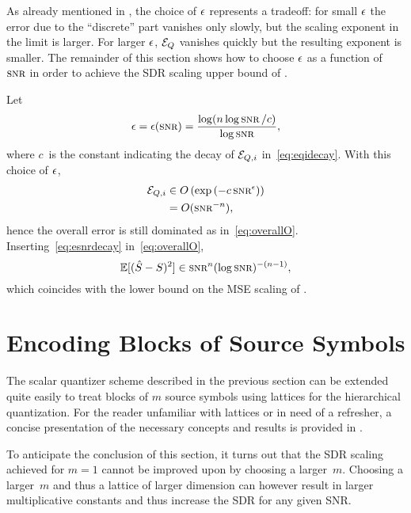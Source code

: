 As already mentioned in , the choice of $\epsilon$ represents a
tradeoff: for small $\epsilon$ the error due to the ``discrete'' part vanishes only
slowly, but the scaling exponent in the limit is larger. For larger $\epsilon$, ${{\mathcal{E}}_Q}$
vanishes quickly but the resulting exponent is smaller. The remainder of this
section shows how to choose $\epsilon$ as a function of~$\snr$ in order to achieve the
SDR scaling upper bound of .

Let
\begin{equation}
  \label{eq:esnrdecay}
  \e = \e(\snr) = \frac{\log(n \log\snr / c)}{\log\snr},
\end{equation}
where $c$~is the constant indicating the decay of ${{\mathcal{E}}_{Q,i}}$ in~\eqref{eq:eqidecay}.
With this choice of $\epsilon$,
\begin{align*}
  \Eqi &\in O\left( \exp\left( - c \snr^\e \right) \right) \\
 &= O(\snr^{-n}),
\end{align*}
hence the overall error is still dominated as in~\eqref{eq:overallO}.
Inserting~\eqref{eq:esnrdecay} in~\eqref{eq:overallO},
\begin{equation*}
  \mse \in \snr^n (\log\snr)^{-(n-1)},
\end{equation*}
which coincides with the lower bound on the MSE scaling of .







\section{Encoding Blocks of Source Symbols}\label{sec:latticequant}

The scalar quantizer scheme described in the previous section can be extended
quite easily to treat blocks of $m$ source symbols using lattices for the
hierarchical quantization. For the reader unfamiliar with lattices or in need of
a refresher, a concise presentation of the necessary concepts and results is
provided in .

To anticipate the conclusion of this section, it turns out that the SDR scaling
achieved for $m=1$ cannot be improved upon by choosing a larger~$m$. Choosing a
larger~$m$ and thus a lattice of larger dimension can however result in larger
multiplicative constants and thus increase the SDR for any given SNR.


